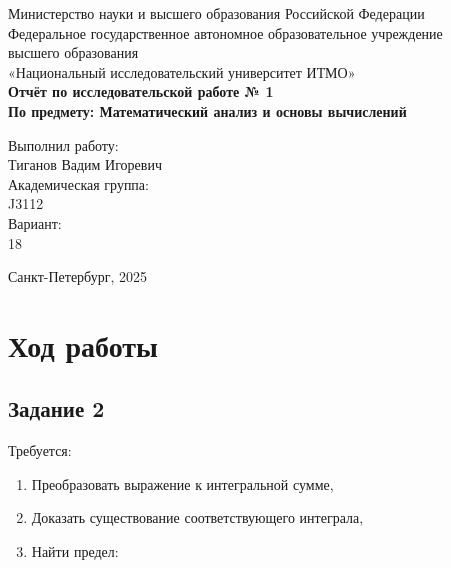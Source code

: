 \documentclass[a4paper,12pt]{article}
\begin{document}
\thispagestyle{empty}
\begin{center}
    \large
    Министерство науки и высшего образования Российской Федерации\\
    Федеральное государственное автономное образовательное учреждение\\
    высшего образования\\
    «Национальный исследовательский университет ИТМО»\\
    \vspace{5cm}
    \textbf{Отчёт по исследовательской работе № 1}\\
    \textbf{По предмету: Математический анализ и основы вычислений}\\
    \vspace{6cm}
    \begin{flushright}
        Выполнил работу:\\ Тиганов Вадим Игоревич\\
        \vspace{1cm}
        Академическая группа: \\ J3112\\
        \vspace{1cm}
        Вариант: \\18
    \end{flushright}
    \vspace{1cm}
    \vspace{3cm}
    \begin{center}
        Санкт-Петербург, 2025\\
    \end{center}
\end{center}

\newpage


\section{Ход работы}


\subsection{Задание 2}

Требуется:
\begin{enumerate}
    \item Преобразовать выражение к интегральной сумме,
    \item Доказать существование соответствующего интеграла,
    \item Найти предел:
\end{enumerate}
\end{document}

